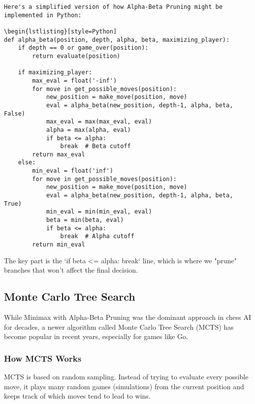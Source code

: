 \documentclass[11pt]{article}
\begin{document}
\begin{lstlisting}[style=Python]
Here's a simplified version of how Alpha-Beta Pruning might be implemented in Python:

\begin{lstlisting}[style=Python]
def alpha_beta(position, depth, alpha, beta, maximizing_player):
    if depth == 0 or game_over(position):
        return evaluate(position)

    if maximizing_player:
        max_eval = float('-inf')
        for move in get_possible_moves(position):
            new_position = make_move(position, move)
            eval = alpha_beta(new_position, depth-1, alpha, beta, False)
            max_eval = max(max_eval, eval)
            alpha = max(alpha, eval)
            if beta <= alpha:
                break  # Beta cutoff
        return max_eval
    else:
        min_eval = float('inf')
        for move in get_possible_moves(position):
            new_position = make_move(position, move)
            eval = alpha_beta(new_position, depth-1, alpha, beta, True)
            min_eval = min(min_eval, eval)
            beta = min(beta, eval)
            if beta <= alpha:
                break  # Alpha cutoff
        return min_eval
\end{lstlisting}

The key part is the `if beta <= alpha: break` line, which is where we "prune" branches that won't affect the final decision.

\subsection{Monte Carlo Tree Search}

While Minimax with Alpha-Beta Pruning was the dominant approach in chess AI for decades, a newer algorithm called Monte Carlo Tree Search (MCTS) has become popular in recent years, especially for games like Go.

\subsubsection{How MCTS Works}

MCTS is based on random sampling. Instead of trying to evaluate every possible move, it plays many random games (simulations) from the current position and keeps track of which moves tend to lead to wins.
\end{document}
